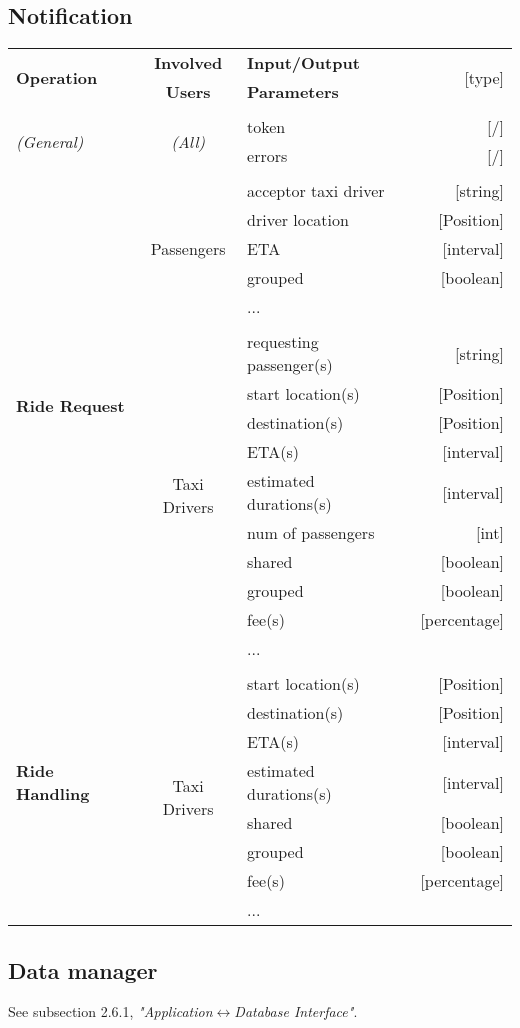 \subsection{Notification}
	\begin{center}
		\begin{tabular}{ l | c | l   r }
			\multirow{2}{*}{\textbf{Operation}} & \textbf{Involved} & \textbf{Input/Output} & \multirow{2}{*}{[type]}\\
			& \textbf{Users} & \textbf{Parameters} & \\ [1.5ex]
			\hline\hline\\
			
			\multirow{2}{*}{\textit{(General)}}
				& \multirow{2}{*}{\textit{(All)}}
					&	token & [/]\\
					&&	errors & [/]\\ [1.5ex]
			\hline\\
			
			\multirow{15}{*}{\textbf{Ride Request}}
				& \multirow{5}{*}{Passengers}
					&	acceptor taxi driver & [string]\\
				\multirow{15}{*}{\textbf{Notification}}
					&&	driver location & [Position]\\
					&&	ETA & [interval]\\
					&&	grouped & [boolean]\\
					&&	... & \\ [1.5ex]
			\cline{2-4}\\
				& \multirow{10}{*}{Taxi Drivers}
					&	requesting passenger(s) & [string]\\
					&&	start location(s) & [Position]\\
					&&	destination(s) & [Position]\\
					&&	ETA(s) & [interval]\\
					&&	estimated durations(s) & [interval]\\
					&&	num of passengers & [int]\\
					&&	shared & [boolean]\\
					&&	grouped & [boolean]\\
					&&	fee(s) & [percentage]\\
					&&	... & \\ [1.5ex]
			\hline\\
			
			\multirow{7}{*}{\textbf{Ride Handling}}
				& \multirow{8}{*}{Taxi Drivers}
					&	start location(s) & [Position]\\
			\multirow{7}{*}{\textbf{Notification}}
					&&	destination(s) & [Position]\\
					&&	ETA(s) & [interval]\\
					&&	estimated durations(s) & [interval]\\
					&&	shared & [boolean]\\
					&&	grouped & [boolean]\\
					&&	fee(s) & [percentage]\\
					&&	... & \\ [1.5ex]
			\hline
		\end{tabular}
	\end{center}
	
\subsection{Data manager}
	See subsection 2.6.1, \textit{"Application$\leftrightarrow$Database Interface"}.